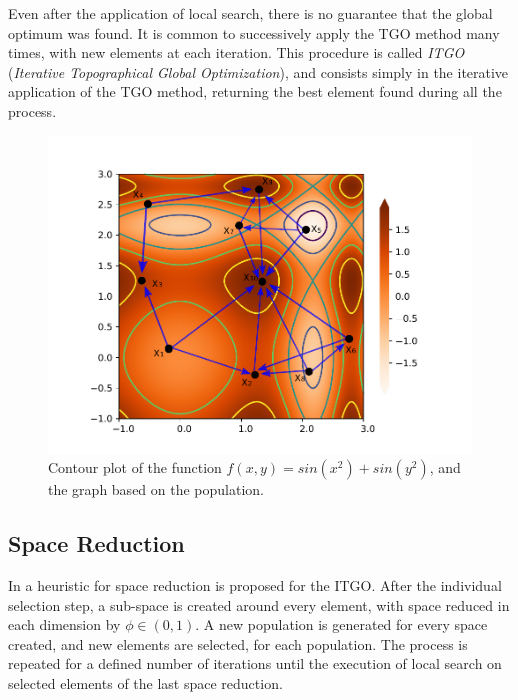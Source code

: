 Even after the application of local search, there is no guarantee that the global optimum was found. It is common to successively apply the TGO method many times, with new elements at each iteration. This procedure is called \textit{ITGO} (\textit{Iterative Topographical Global Optimization}), and consists simply in the iterative application of the TGO method, returning the best element found during all the process.



\begin{figure}[tp]
\begin{center}
\includegraphics[scale=0.6]{img/Topo/fig_1_t.pdf}
\end{center}
\captionsetup{justification=centering}
\vspace*{-7mm} 
\caption{Contour plot of the function $f(x, y) = sin(x^2) + sin(y^2)$, and the graph based on the population.}\label{fig:Graph}
\end{figure}


\subsection{Space Reduction}

In \cite{ITGO4} a heuristic for space reduction is proposed for the ITGO. After the individual selection step, a sub-space is created around every element, with space reduced in each dimension by $\phi \in (0, 1)$. A new population is generated for every space created, and new elements are selected, for each population. The process is repeated for a defined number of iterations until the execution of local search on selected elements of the last space reduction.

